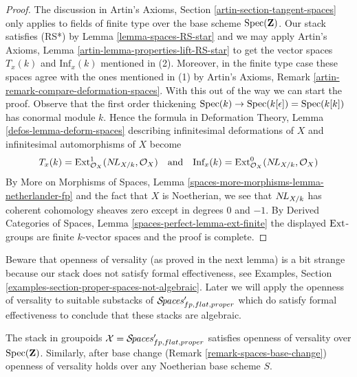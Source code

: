 \begin{proof}
The discussion in Artin's Axioms, Section \ref{artin-section-tangent-spaces}
only applies to fields of finite type over the base scheme $\mathop{\mathrm{Spec}}(\mathbf{Z})$.
Our stack satisfies (RS*) by Lemma \ref{lemma-spaces-RS-star}
and we may apply
Artin's Axioms, Lemma \ref{artin-lemma-properties-lift-RS-star}
to get the vector spaces $T_x(k)$ and $\text{Inf}_x(k)$
mentioned in (2). Moreover, in the finite type case these spaces agree with the
ones mentioned in (1)
by Artin's Axioms, Remark \ref{artin-remark-compare-deformation-spaces}.
With this out of the way we can start the proof.
Observe that the first order thickening
$\mathop{\mathrm{Spec}}(k) \to \mathop{\mathrm{Spec}}(k[\epsilon]) = \mathop{\mathrm{Spec}}(k[k])$
has conormal module $k$. Hence the formula in
Deformation Theory, Lemma \ref{defos-lemma-deform-spaces}
describing infinitesimal deformations of $X$ and infinitesimal
automorphisms of $X$ become
$$
T_x(k) = \mathop{\mathrm{Ext}}\nolimits^1_{\mathcal{O}_X}(\mathop{N\!L}\nolimits_{X/k}, \mathcal{O}_X)
\quad\text{and}\quad
\text{Inf}_x(k) = \mathop{\mathrm{Ext}}\nolimits^0_{\mathcal{O}_X}(\mathop{N\!L}\nolimits_{X/k}, \mathcal{O}_X)
$$
By More on Morphisms of Spaces, Lemma
\ref{spaces-more-morphisms-lemma-netherlander-fp}
and the fact that $X$ is Noetherian, we see that
$\mathop{N\!L}\nolimits_{X/k}$ has coherent cohomology sheaves zero except
in degrees $0$ and $-1$.
By Derived Categories of Spaces, Lemma \ref{spaces-perfect-lemma-ext-finite}
the displayed $\mathop{\mathrm{Ext}}\nolimits$-groups are finite $k$-vector spaces
and the proof is complete.
\end{proof}

\noindent
Beware that openness of versality (as proved in the next lemma)
is a bit strange because our stack does not satisfy formal effectiveness, see
Examples, Section \ref{examples-section-proper-spaces-not-algebraic}.
Later we will apply the openness of versality to suitable substacks of
$\mathcal{S}\!\mathit{paces}'_{fp, flat, proper}$ which do satisfy
formal effectiveness to conclude that these stacks are algebraic.

\begin{lemma}
\label{lemma-spaces-defo-thy}
The stack in groupoids $\mathcal{X} = \mathcal{S}\!\mathit{paces}'_{fp, flat, proper}$
satisfies openness of versality over $\mathop{\mathrm{Spec}}(\mathbf{Z})$.
Similarly, after base change (Remark \ref{remark-spaces-base-change})
openness of versality holds over any Noetherian base scheme $S$.
\end{lemma}

